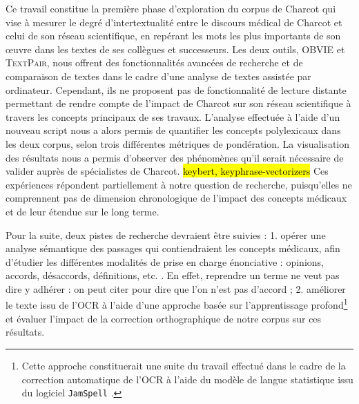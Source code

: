 



Ce travail constitue la première phase d'exploration du corpus de Charcot qui vise à mesurer le degré d'intertextualité entre le discours médical de Charcot et celui de son réseau scientifique, en repérant les mots les plus importants de son \oe{}uvre dans les textes de ses collègues et successeurs. Les deux outils, \textsc{OBVIE} et \textsc{TextPair}, nous offrent des fonctionnalités avancées de recherche et de comparaison de textes dans le cadre d'une analyse de textes assistée par ordinateur. Cependant, ils ne proposent pas de fonctionnalité de lecture distante permettant de rendre compte de l'impact de Charcot sur son réseau scientifique à travers les concepts principaux de ses travaux. L'analyse effectuée à l'aide d'un nouveau script nous a alors permis de quantifier les concepts polylexicaux dans les deux corpus, selon trois différentes métriques de pondération. La visualisation des résultats nous a permis d'observer des phénomènes qu'il serait nécessaire de valider auprès de spécialistes de Charcot. \hl{keybert, keyphrase-vectorizers} Ces expériences répondent partiellement à notre question de recherche, puisqu'elles ne comprennent pas de dimension chronologique de l'impact des concepts médicaux et de leur étendue sur le long terme.

Pour la suite, deux pistes de recherche devraient être suivies : 1. opérer une analyse sémantique des passages qui contiendraient les concepts médicaux, afin d'étudier les différentes modalités de prise en charge énonciative : opinions, accords, désaccords, définitions, etc. \citep{alrahabi2021ariane}. En effet, reprendre un terme ne veut pas dire y adhérer : on peut citer pour dire que l'on
n'est pas d'accord ;  2. améliorer le texte issu de l'\textsc{OCR} à l'aide d'une approche basée sur l'apprentissage profond\footnote{Cette approche constituerait une suite du travail effectué dans le cadre de la correction automatique de l'\textsc{OCR} à l'aide du modèle de langue statistique issu du logiciel \texttt{JamSpell} \citep{petkovic2022impact}.} et évaluer l'impact de la correction orthographique de notre corpus sur ces résultats.



